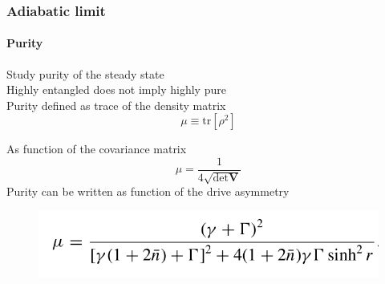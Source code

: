 \documentclass[aspectratio=43]{beamer}
\begin{document}
\begin{frame}
	
	\frametitle{Adiabatic limit}
	\framesubtitle{Purity}
	
	Study purity of the steady state\\
	Highly entangled does not imply highly pure\\
	
	Purity defined as trace of the density matrix
	\begin{equation}
		\mu \equiv \textrm{tr}[\rho^{2}] \nonumber
	\end{equation}	
		
	As function of the covariance matrix
	\begin{equation}
		\mu = \frac{1}{4 \sqrt{\det \textbf{V}}} \nonumber
	\end{equation}
	Purity can be written as function of the drive asymmetry 
	\begin{figure}
		\includegraphics[width = 6.5 cm]{plots/purity.png}
	\end{figure}

\end{frame}
\end{document}
